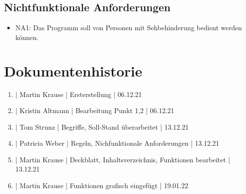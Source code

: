 \documentclass[12pt]{scrartcl}
\begin{document}
\subsection{Nichtfunktionale Anforderungen}

\begin{itemize}
	\item NA1: Das Programm soll von Personen mit Sehbehinderung bedient werden können.
\end{itemize}

\section{Dokumentenhistorie}

\begin{enumerate}
	\item | Martin Krause | Ersterstellung | 06.12.21
	\item | Kristin Altmann | Bearbeitung Punkt 1,2  | 06.12.21
	\item | Tom Strunz | Begriffe, Soll-Stand überarbeitet | 13.12.21
	\item | Patricia Weber | Regeln, Nichfunktionale Anforderungen | 13.12.21
	\item | Martin Krause | Deckblatt, Inhaltsverzeichnis, Funktionen bearbeitet | 13.12.21
	\item | Martin Krause | Funktionen grafisch eingefügt | 19.01.22
\end{enumerate}
 
\end{document}
